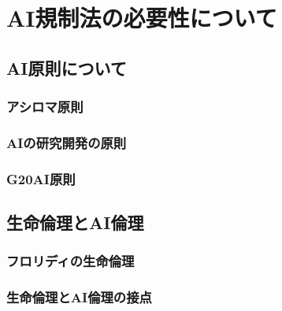 \chapter{AI規制法の必要性について}

\section{AI原則について} %

\subsection{アシロマ原則} 

\subsection{AIの研究開発の原則} 

\subsection{G20AI原則}

\section{生命倫理とAI倫理} %

\subsection{フロリディの生命倫理}

\subsection{生命倫理とAI倫理の接点}





